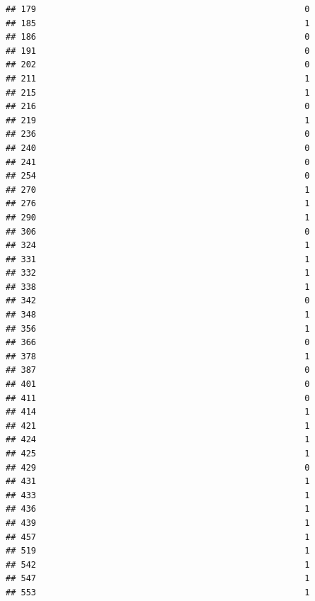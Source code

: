 \documentclass[
]{article}
\begin{document}
\begin{verbatim}
## 179                                                     0
## 185                                                     1
## 186                                                     0
## 191                                                     0
## 202                                                     0
## 211                                                     1
## 215                                                     1
## 216                                                     0
## 219                                                     1
## 236                                                     0
## 240                                                     0
## 241                                                     0
## 254                                                     0
## 270                                                     1
## 276                                                     1
## 290                                                     1
## 306                                                     0
## 324                                                     1
## 331                                                     1
## 332                                                     1
## 338                                                     1
## 342                                                     0
## 348                                                     1
## 356                                                     1
## 366                                                     0
## 378                                                     1
## 387                                                     0
## 401                                                     0
## 411                                                     0
## 414                                                     1
## 421                                                     1
## 424                                                     1
## 425                                                     1
## 429                                                     0
## 431                                                     1
## 433                                                     1
## 436                                                     1
## 439                                                     1
## 457                                                     1
## 519                                                     1
## 542                                                     1
## 547                                                     1
## 553                                                     1

\end{verbatim}
\end{document}
